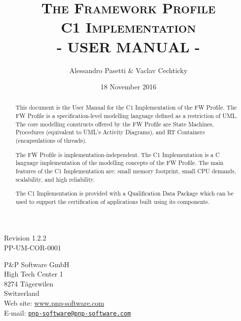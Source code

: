 \documentclass[a4paper,10pt]{article}
\title{\textsc{The Framework Profile} \\ \textsc{C1 Implementation} \\ \textsc{- USER MANUAL -}}
\author{Alessandro Pasetti \& Vaclav Cechticky}
\date{18 November 2016}
\begin{document}
\maketitle

\begin{center}
Revision 1.2.2 \\
PP-UM-COR-0001
\end{center}

\begin{center}
P\&P Software GmbH \\
High Tech Center 1 \\
8274 T\"{a}gerwilen \\
Switzerland \\
\vspace{2mm}
Web site: \url{www.pnp-software.com}\\
E-mail: \href{mailto:pnp-software@pnp-software.com}{\nolinkurl{pnp-software@pnp-software.com}} 
\end{center}

\begin{table}[ht]
\begin{center}
\begin{tabular}{p{11.7cm}}
\\
\hline
\end{tabular}
\end{center}
\end{table}
\begin{abstract}
This document is the User Manual for the C1 Implementation of the FW Profile. The FW Profile is a specification-level modelling language defined as a restriction of UML. The core modelling constructs offered by the FW Profile are State Machines, Procedures (equivalent to UML's Activity Diagrams), and RT Containers (encapsulations of threads).
\par
The FW Profile is implementation-independent. The C1 Implementation is a C language implementation of the modelling concepts of the FW Profile. The main features of the C1 Implementation are: small memory footprint, small CPU demands, scalability, and
high reliability.
\par 
The C1 Implementation is provided with a Qualification Data Package which can be used to support the certification of applications built using its components.
\end{abstract}
\begin{table}[ht]
\begin{center}
\begin{tabular}{p{11.7cm}}
\\
\hline
\end{tabular}
\end{center}
\end{table}
\end{document}
